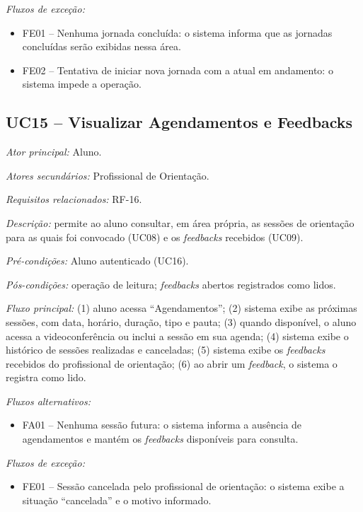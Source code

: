 \textit{Fluxos de exceção:}

\begin{itemize}[label={},leftmargin=\parindent,itemsep=0pt,topsep=0pt]
  \item FE01 – Nenhuma jornada concluída: o sistema informa que as jornadas concluídas serão exibidas nessa área.
  \item FE02 – Tentativa de iniciar nova jornada com a atual em andamento: o sistema impede a operação.
\end{itemize}

\subsection*{UC15 -- Visualizar Agendamentos e Feedbacks}\label{uc:uc15}

\textit{Ator principal:} Aluno.

\textit{Atores secundários:} Profissional de Orientação.

\textit{Requisitos relacionados:} RF-16.

\textit{Descrição:} permite ao aluno consultar, em área própria, as sessões de orientação para as quais foi convocado (UC08) e os \textit{feedbacks} recebidos (UC09).

\textit{Pré-condições:} Aluno autenticado (UC16).

\textit{Pós-condições:} operação de leitura; \textit{feedbacks} abertos registrados como lidos.

\textit{Fluxo principal:} (1) aluno acessa ``Agendamentos''; (2) sistema exibe as próximas sessões, com data, horário, duração, tipo e pauta; (3) quando disponível, o aluno acessa a videoconferência ou inclui a sessão em sua agenda; (4) sistema exibe o histórico de sessões realizadas e canceladas; (5) sistema exibe os \textit{feedbacks} recebidos do profissional de orientação; (6) ao abrir um \textit{feedback}, o sistema o registra como lido.

\textit{Fluxos alternativos:}

\begin{itemize}[label={},leftmargin=\parindent,itemsep=0pt,topsep=0pt]
  \item FA01 – Nenhuma sessão futura: o sistema informa a ausência de agendamentos e mantém os \textit{feedbacks} disponíveis para consulta.
\end{itemize}

\textit{Fluxos de exceção:}

\begin{itemize}[label={},leftmargin=\parindent,itemsep=0pt,topsep=0pt]
  \item FE01 – Sessão cancelada pelo profissional de orientação: o sistema exibe a situação ``cancelada'' e o motivo informado.
\end{itemize}

